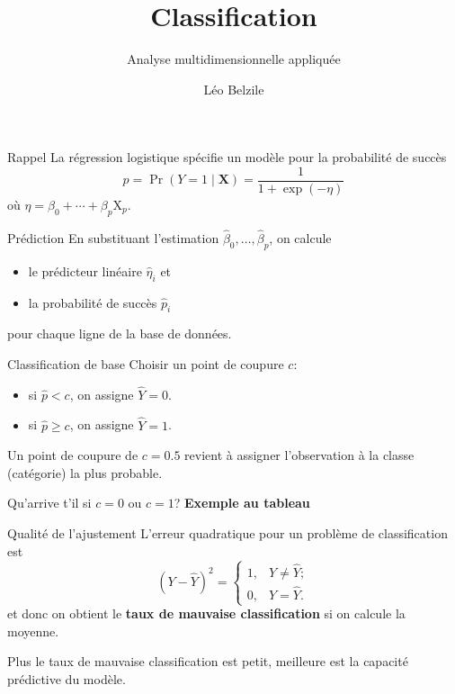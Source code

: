 \documentclass[
  ignorenonframetext,
]{beamer}
\title{Classification}
\subtitle{Analyse multidimensionnelle appliquée}
\author{Léo Belzile}
\date{}
\institute{HEC Montréal}
\providecommand{\tightlist}{%
  \setlength{\itemsep}{0pt}\setlength{\parskip}{0pt}}\usepackage{longtable,booktabs,array}
\begin{document}
\frame{\titlepage}
\ifdefined\Shaded\renewenvironment{Shaded}{\begin{tcolorbox}[interior hidden, breakable, sharp corners, boxrule=0pt, enhanced, frame hidden, borderline west={3pt}{0pt}{shadecolor}]}{\end{tcolorbox}}\fi

\begin{frame}{Rappel}
\protect\hypertarget{rappel}{}
La régression logistique spécifie un modèle pour la probabilité de
succès \[p = \Pr(Y=1 \mid \mathbf{X}) = \frac{1}{1+\exp(-\eta)}\] où
\(\eta = \beta_0 + \cdots + \beta_p \mathrm{X}_p\).
\end{frame}

\begin{frame}{Prédiction}
\protect\hypertarget{pruxe9diction}{}
En substituant l'estimation
\(\widehat{\beta}_0, \ldots, \widehat{\beta}_p\), on calcule

\begin{itemize}
\tightlist
\item
  le prédicteur linéaire \(\widehat{\eta}_i\) et
\item
  la probabilité de succès \(\widehat{p}_i\)
\end{itemize}

pour chaque ligne de la base de données.
\end{frame}

\begin{frame}{Classification de base}
\protect\hypertarget{classification-de-base}{}
Choisir un point de coupure \(c\):

\begin{itemize}
\tightlist
\item
  si \(\widehat{p} < c\), on assigne \(\widehat{Y}=0\).
\item
  si \(\widehat{p} \geq c\), on assigne \(\widehat{Y}=1\).
\end{itemize}

Un point de coupure de \(c=0.5\) revient à assigner l'observation à la
classe (catégorie) la plus probable.

Qu'arrive t'il si \(c=0\) ou \(c=1\)? \textbf{Exemple au tableau}
\end{frame}

\begin{frame}{Qualité de l'ajustement}
\protect\hypertarget{qualituxe9-de-lajustement}{}
L'erreur quadratique pour un problème de classification est
\[(Y-\widehat{Y})^2 = \begin{cases} 1, & Y \neq \widehat{Y}; \\0, & Y = \widehat{Y}.\end{cases}\]
et donc on obtient le \textbf{taux de mauvaise classification} si on
calcule la moyenne.

Plus le taux de mauvaise classification est petit, meilleure est la
capacité prédictive du modèle.
\end{frame}
\end{document}
